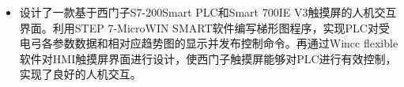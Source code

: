 





\begin{itemize}
    \item 设计了一款基于西门子S7-200Smart PLC和Smart 700IE V3触摸屏的人机交互界面。利用STEP 7-MicroWIN SMART软件编写梯形图程序，实现PLC对受电弓各参数数据和相对应趋势图的显示并发布控制命令。再通过Wincc flexible软件对HMI触摸屏界面进行设计，使西门子触摸屏能够对PLC进行有效控制，实现了良好的人机交互。
\end{itemize}








